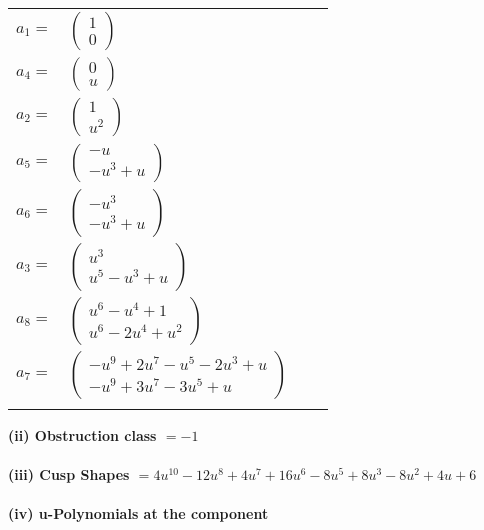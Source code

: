 \documentclass[1p]{elsarticle_modified}
\theoremstyle{definition}
\begin{document}
\begin{tabular}{m{7pt} m{180pt} m{7pt} m{180pt} }
\flushright $a_{1}=$&$\begin{pmatrix}1\\0\end{pmatrix}$ \\
\flushright $a_{4}=$&$\begin{pmatrix}0\\u\end{pmatrix}$ \\
\flushright $a_{2}=$&$\begin{pmatrix}1\\u^2\end{pmatrix}$ \\
\flushright $a_{5}=$&$\begin{pmatrix}- u\\- u^3+u\end{pmatrix}$ \\
\flushright $a_{6}=$&$\begin{pmatrix}- u^3\\- u^3+u\end{pmatrix}$ \\
\flushright $a_{3}=$&$\begin{pmatrix}u^3\\u^5- u^3+u\end{pmatrix}$ \\
\flushright $a_{8}=$&$\begin{pmatrix}u^6- u^4+1\\u^6-2 u^4+u^2\end{pmatrix}$ \\
\flushright $a_{7}=$&$\begin{pmatrix}- u^9+2 u^7- u^5-2 u^3+u\\- u^9+3 u^7-3 u^5+u\end{pmatrix}$\\&\end{tabular}
\flushleft \textbf{(ii) Obstruction class $= -1$}\\~\\
\flushleft \textbf{(iii) Cusp Shapes $= 4 u^{10}-12 u^8+4 u^7+16 u^6-8 u^5+8 u^3-8 u^2+4 u+6$}\\~\\
\newpage\renewcommand{\arraystretch}{1}
\flushleft \textbf{(iv) u-Polynomials at the component}\newline \\
\end{document}
